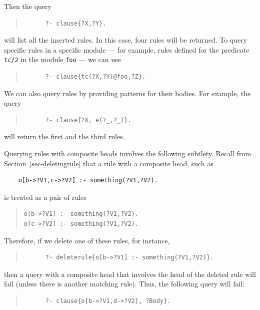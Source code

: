 \documentclass[11pt]{article}
\begin{document}
Then the query
\begin{quote}
\begin{verbatim}
      ?- clause{?X,?Y}.
\end{verbatim}
\end{quote}
\noindent
will list all the inserted rules.  In this case, four rules will be
returned.  To query specific rules in a specific module --- for example,
rules defined for the predicate {\tt tc/2} in the module {\tt foo} --- we
can use
\begin{quote}
\begin{verbatim}
      ?- clause{tc(?X,?Y)@foo,?Z}.
\end{verbatim}
\end{quote}
We can also query rules by providing patterns for their bodies. For
example, the query
\begin{quote}
\begin{verbatim}
      ?- clause{?X, e(?_,?_)}.
\end{verbatim}
\end{quote}
\noindent
will return the first and the third rules.

Querying rules with composite heads involves the following  subtlety.
Recall from Section~\ref{sec-deletingrule} 
that a rule with a composite head, such as 
\begin{verbatim}
    o[b->?V1,c->?V2] :- something(?V1,?V2).     
\end{verbatim}
is treated as a pair of rules
\begin{quote}
\begin{verbatim}
o[b->?V1] :- something(?V1,?V2).     
o[c->?V2] :- something(?V1,?V2).     
\end{verbatim}
\end{quote}
Therefore, if we delete one of these rules, for instance,
\begin{quote}
\begin{verbatim}
      ?- deleterule{o[b->?V1] :- something(?V1,?V2)}.
\end{verbatim}
\end{quote}
then a query with a composite head that involves the head of the deleted
rule will fail (unless there is another matching rule).
Thus, the following query will fail:
\begin{quote}
\begin{verbatim}
      ?- clause{o[b->?V1,d->?V2], ?Body}.
\end{verbatim}
\end{quote}
\end{document}
